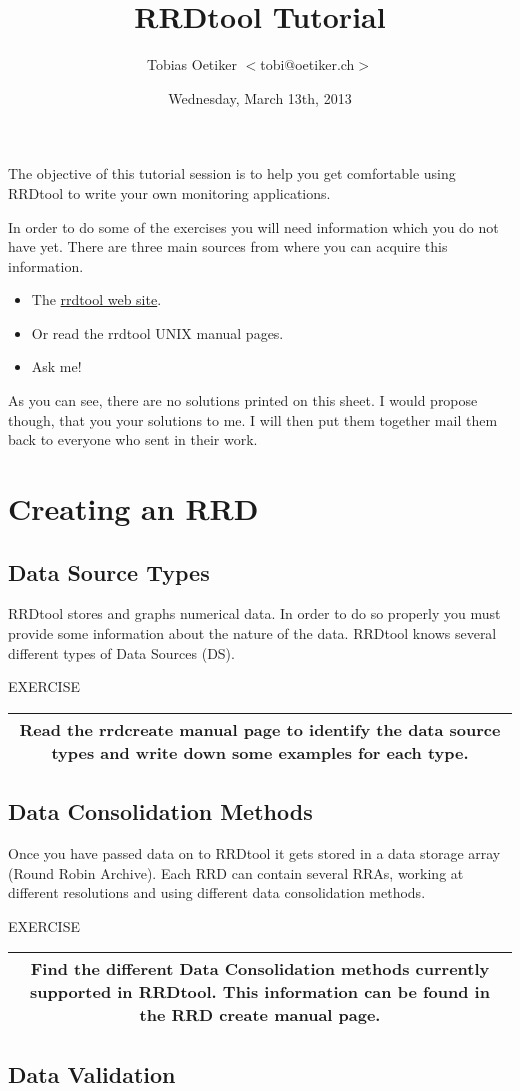 \documentclass[a4paper,12pt]{article}
\title{RRDtool Tutorial}
\date{Wednesday, March 13th, 2013}
\author{Tobias Oetiker $<$tobi@oetiker.ch$>$}
\newenvironment{work}{\textsf{\tiny EXERCISE}\nopagebreak\\[0.3ex]\begin{tabular}{|c|}
 \hline
 \begin{minipage}{0.965\linewidth}%
 \setlength{\parskip}{1.6ex plus 0.6ex minus 0.4ex}%
 \rule{0pt}{2.8ex}\ignorespaces}
{\rule[-1.8ex]{0pt}{0pt}\end{minipage}\\
 \hline
 \end{tabular}}
\newcommand{\ex}[1]{\subsection{#1}}
\begin{document}
\maketitle

The objective of this tutorial session is to help you get comfortable using
RRDtool to write your own monitoring applications.

In order to do some of the exercises you will need information which
you do not have yet. There are three main sources from where you can
acquire this information.

\begin{itemize}
\item The \href{http://oss.oetiker.ch/rrdtool}{rrdtool web site}.
\item Or read the rrdtool UNIX manual pages.
\item Ask me!
\end{itemize}

As you can see, there are no solutions printed on this sheet. I would
propose though, that you your solutions to me. I will then put them together
mail them back to everyone who sent in their work.


\newpage
\section{Creating an RRD}
\ex{Data Source Types}

RRDtool stores and graphs numerical data. In order to do so
properly you must provide some information about the nature of the
data. RRDtool knows several different types of Data Sources (DS).

\begin{work}
  Read the rrdcreate manual page to identify the data source types
  and write down some examples for each type.
\end{work}

\ex{Data Consolidation Methods}

Once you have passed data on to RRDtool it gets stored in a data
storage array (Round Robin Archive). Each RRD can contain several
RRAs, working at different resolutions and using different data
consolidation methods.

\begin{work}
  Find the different Data Consolidation methods currently supported in
  RRDtool. This information can be found in the RRD create manual
  page.
\end{work}

\ex{Data Validation}
\end{document}
